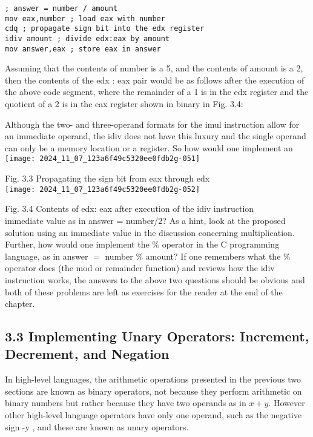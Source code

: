 \documentclass[10pt]{article}
\begin{document}
\begin{verbatim}
; answer = number / amount
mov eax,number ; load eax with number
cdq ; propagate sign bit into the edx register
idiv amount ; divide edx:eax by amount
mov answer,eax ; store eax in answer
\end{verbatim}

Assuming that the contents of number is a 5, and the contents of amount is a 2, then the contents of the edx : eax pair would be as follows after the execution of the above code segment, where the remainder of a 1 is in the edx register and the quotient of a 2 is in the eax register shown in binary in Fig. 3.4:

Although the two- and three-operand formats for the imul instruction allow for an immediate operand, the idiv does not have this luxury and the single operand can only be a memory location or a register. So how would one implement an\\
\texttt{[image: 2024\_11\_07\_123a6f49c5320ee0fdb2g-051]}

Fig. 3.3 Propagating the sign bit from eax through edx\\
\texttt{[image: 2024\_11\_07\_123a6f49c5320ee0fdb2g-052]}

Fig. 3.4 Contents of edx: eax after execution of the idiv instruction\\
immediate value as in answer = number/2? As a hint, look at the proposed solution using an immediate value in the discussion concerning multiplication. Further, how would one implement the $\%$ operator in the C programming language, as in answer $=$ number $\%$ amount? If one remembers what the $\%$ operator does (the mod or remainder function) and reviews how the idiv instruction works, the answers to the above two questions should be obvious and both of these problems are left as exercises for the reader at the end of the chapter.

\subsection*{3.3 Implementing Unary Operators: Increment, Decrement, and Negation}
In high-level languages, the arithmetic operations presented in the previous two sections are known as binary operators, not because they perform arithmetic on binary numbers but rather because they have two operands as in $x+y$. However other high-level language operators have only one operand, such as the negative sign -y , and these are known as unary operators.
\end{document}
